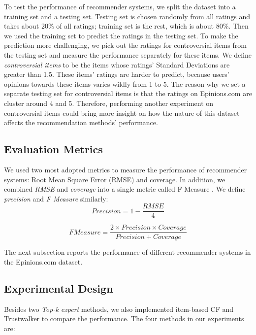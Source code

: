\documentclass[12pt]{article}
\begin{document}
To test the performance of recommender systems, we split the dataset into a training set and a testing set. Testing set is chosen randomly from all ratings and takes about 20\% of all ratings; training set is the rest, which is about 80\%. Then we used the training set to predict the ratings in the testing set. To make the prediction more challenging, we pick out the ratings for controversial items from the testing set and measure the performance separately for these items. We define \emph{controversial items} to be the items whose ratings' Standard Deviations are greater than 1.5. These items' ratings are harder to predict, because users' opinions towards these items varies wildly from 1 to 5. The reason why we set a separate testing set for controversial items is that the ratings on Epinions.com are cluster around 4 and 5. Therefore, performing another experiment on controversial items could bring more insight on how the nature of this dataset affects the recommendation methods' performance. 


\subsection{Evaluation Metrics}

We used two most adopted metrics to measure the performance of recommender systems: Root Mean Square Error (RMSE) and coverage. In addition, we combined \emph{RMSE} and \emph{coverage} into a single metric called F Measure \cite{Jamali:2009p67}. We define \emph{precision} and \emph{F Measure} similarly:
\begin{equation}
Precision = 1 - \frac{RMSE}{4}
\end{equation}

\begin{equation}
F Measure = \frac{2 \times Precision \times Coverage}{Precision + Coverage}
\end{equation}

The next subsection reports the performance of different recommender systems in the Epinions.com dataset. 


\subsection{Experimental Design}
Besides two \emph{Top-k expert} methods, we also implemented item-based CF and Trustwalker to compare the performance. The four methods in our experiments are:
\end{document}
